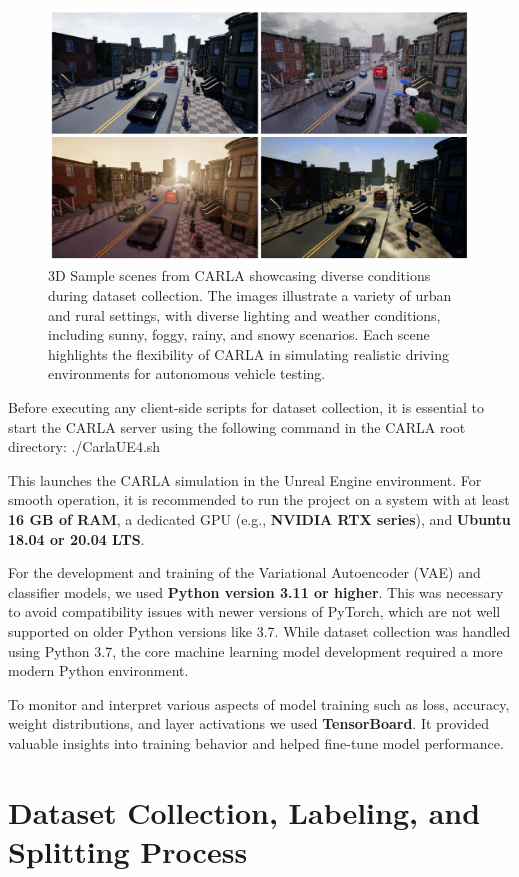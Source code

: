 \begin{figure}[htbp]
    \centering
    \includegraphics[width=0.7\linewidth]{img/carla/CARLA_Environment.png}
    \caption{3D Sample scenes from CARLA showcasing diverse conditions during dataset collection. The images illustrate a variety of urban and rural settings, with diverse lighting and weather conditions, including sunny, foggy, rainy, and snowy scenarios. Each scene highlights the flexibility of CARLA in simulating realistic driving environments for autonomous vehicle testing.}
    \label{fig:carla_scenes}
\end{figure}


Before executing any client-side scripts for dataset collection, it is essential to start the CARLA server using the following command in the CARLA root directory: ./CarlaUE4.sh


This launches the CARLA simulation in the Unreal Engine environment. For smooth operation, it is recommended to run the project on a system with at least \textbf{16 GB of RAM}, a dedicated GPU (e.g., \textbf{NVIDIA RTX series}), and \textbf{Ubuntu 18.04 or 20.04 LTS}. 

For the development and training of the Variational Autoencoder (VAE) and classifier models, we used \textbf{Python version 3.11 or higher}. This was necessary to avoid compatibility issues with newer versions of PyTorch, which are not well supported on older Python versions like 3.7. While dataset collection was handled using Python 3.7, the core machine learning model development required a more modern Python environment.  

To monitor and interpret various aspects of model training such as loss, accuracy, weight distributions, and layer activations we used \textbf{TensorBoard}. It provided valuable insights into training behavior and helped fine-tune model performance.

\section{Dataset Collection, Labeling, and Splitting Process}

